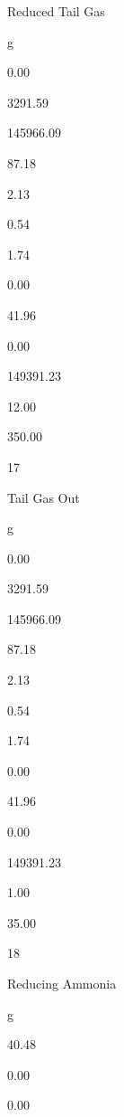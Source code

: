 \documentclass[a4paper,portrait,12pt]{article}
\begin{document}
\begin{flushleft}
Reduced Tail Gas
\end{flushleft}


\begin{flushleft}
g
\end{flushleft}


0.00


3291.59


145966.09


87.18


2.13


0.54


1.74


0.00


41.96


0.00


149391.23


12.00


350.00





17


\begin{flushleft}
Tail Gas Out
\end{flushleft}


\begin{flushleft}
g
\end{flushleft}


0.00


3291.59


145966.09


87.18


2.13


0.54


1.74


0.00


41.96


0.00


149391.23


1.00


35.00





18


\begin{flushleft}
Reducing Ammonia
\end{flushleft}


\begin{flushleft}
g
\end{flushleft}


40.48


0.00


0.00
\end{document}
